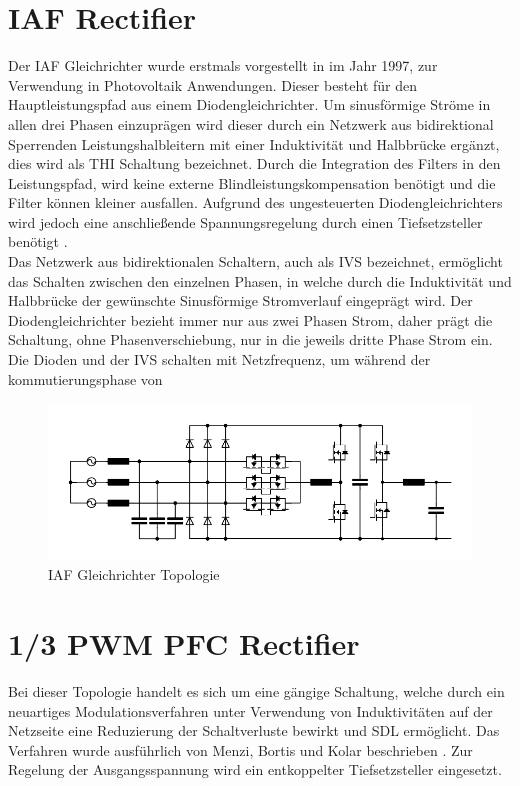 \section{IAF Rectifier }
Der \gls{IAF} Gleichrichter wurde erstmals vorgestellt in \cite{IAFfirst} im Jahr 1997, zur Verwendung in Photovoltaik Anwendungen. Dieser besteht für den Hauptleistungspfad aus einem Diodengleichrichter. Um sinusförmige Ströme in allen drei Phasen einzuprägen wird dieser durch ein Netzwerk aus bidirektional Sperrenden Leistungshalbleitern mit einer Induktivität und Halbbrücke ergänzt, dies wird als \gls{THI} Schaltung bezeichnet. Durch die Integration des Filters in den Leistungspfad, wird keine externe Blindleistungskompensation benötigt und die Filter können kleiner ausfallen. Aufgrund des ungesteuerten Diodengleichrichters wird jedoch eine anschließende Spannungsregelung durch einen Tiefsetzsteller benötigt \cite{ThesisSchrittwieserBuckTypePFC_2017}.\\
Das Netzwerk aus bidirektionalen Schaltern, auch als \gls{IVS} bezeichnet, ermöglicht das Schalten zwischen den einzelnen Phasen, in welche durch die Induktivität und Halbbrücke der gewünschte Sinusförmige Stromverlauf eingeprägt wird. Der Diodengleichrichter bezieht immer nur aus zwei Phasen Strom, daher prägt die Schaltung, ohne Phasenverschiebung, nur in die jeweils dritte Phase Strom ein. Die Dioden und der \gls{IVS} schalten mit Netzfrequenz, um während der kommutierungsphase von 
\begin{figure}
	\centering
	\includegraphics[width=0.9\linewidth]{content/Grafiken/IAF}
	\caption[\gls{IAF} Gleichrichter Topologie]{\gls{IAF} Gleichrichter Topologie}
	\label{fig:iaf}
\end{figure}


\section{1/3 PWM PFC Rectifier}
Bei dieser Topologie handelt es sich um eine gängige Schaltung, welche durch ein neuartiges Modulationsverfahren unter Verwendung von Induktivitäten auf der Netzseite eine Reduzierung der Schaltverluste bewirkt und \gls{SDL} ermöglicht. Das Verfahren wurde ausführlich von Menzi, Bortis und Kolar beschrieben \cite{13PWMPFC}. Zur Regelung der Ausgangsspannung wird ein entkoppelter Tiefsetzsteller eingesetzt.



